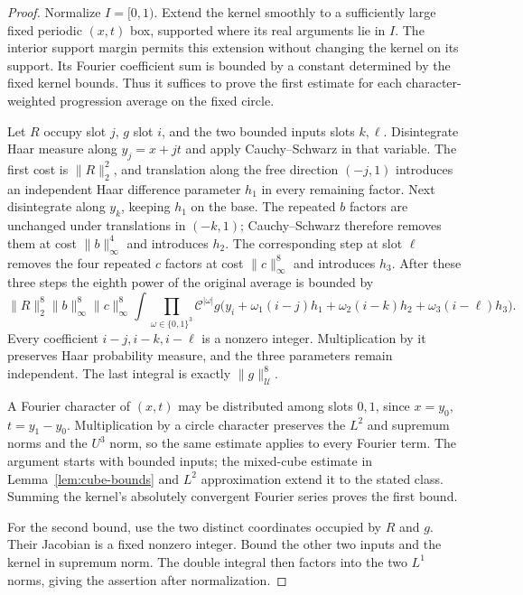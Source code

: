 \begin{proof}
Normalize \(I=[0,1)\).
Extend the kernel smoothly to a sufficiently large fixed periodic
\((x,t)\) box, supported where its real arguments lie in \(I\).
The interior support margin permits this extension without changing
the kernel on its support.
Its Fourier coefficient sum is bounded by a constant determined by
the fixed kernel bounds.  Thus it suffices to prove the first estimate
for each character-weighted progression average on the fixed circle.

Let \(R\) occupy slot \(j\), \(g\) slot \(i\), and the two bounded
inputs slots \(k,\ell\).
Disintegrate Haar measure along \(y_j=x+jt\) and apply
Cauchy--Schwarz in that variable.
The first cost is \(\|R\|_2^2\), and translation along the free
direction \((-j,1)\) introduces an independent Haar difference
parameter \(h_1\) in every remaining factor.
Next disintegrate along \(y_k\), keeping \(h_1\) on the base.
The repeated \(b\) factors are unchanged under translations in
\((-k,1)\); Cauchy--Schwarz therefore removes them at cost
\(\|b\|_\infty^4\) and introduces \(h_2\).
The corresponding step at slot \(\ell\) removes the four repeated
\(c\) factors at cost \(\|c\|_\infty^8\) and introduces \(h_3\).
After these three steps the eighth power of the original average
is bounded by
\[
 \|R\|_2^8\|b\|_\infty^8\|c\|_\infty^8
 \int\prod_{\omega\in\{0,1\}^3}
    \mathcal C^{|\omega|}
    g\bigl(y_i+\omega_1(i-j)h_1
                  +\omega_2(i-k)h_2+\omega_3(i-\ell)h_3\bigr).
\]
Every coefficient \(i-j,i-k,i-\ell\) is a nonzero integer.
Multiplication by it preserves Haar probability measure, and the
three parameters remain independent.  The last integral is exactly
\(\|g\|_{\mathcal U}^8\).

A Fourier character of \((x,t)\) may be distributed among slots
\(0,1\), since \(x=y_0\), \(t=y_1-y_0\).
Multiplication by a circle character preserves the \(L^2\) and
supremum norms and the \(U^3\) norm, so the same estimate applies to
every Fourier term.  The argument starts with bounded inputs; the
mixed-cube estimate in Lemma~\ref{lem:cube-bounds} and \(L^2\)
approximation extend it to the stated class.
Summing the kernel's absolutely convergent Fourier series proves
the first bound.

For the second bound, use the two distinct coordinates occupied by
\(R\) and \(g\).  Their Jacobian is a fixed nonzero integer.
Bound the other two inputs and the kernel in supremum norm.
The double integral then factors into the two \(L^1\) norms,
giving the assertion after normalization.
\end{proof}

